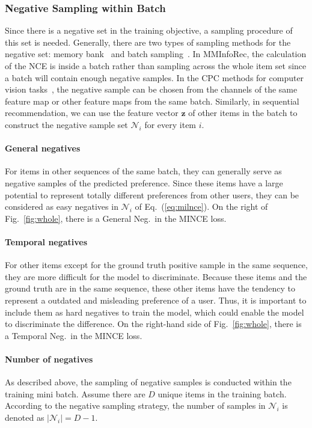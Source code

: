 \documentclass[conference]{IEEEtran}
\begin{document}
\subsubsection{Negative Sampling within Batch}
\label{sec:neg}
Since there is a negative set in the training objective, a sampling procedure of this set is needed. Generally, there are two types of sampling methods for the negative set: memory bank~\cite{moco} and batch sampling~\cite{simclr,cpc,ecpc,memdpc,deepinfomax}. In MMInfoRec, the calculation of the NCE is inside a batch rather than sampling across the whole item set since a batch will contain enough negative samples. In the CPC methods for computer vision tasks~\cite{cpc,ecpc,memdpc,deepinfomax}, the negative sample can be chosen from the channels of the same feature map or other feature maps from the same batch. Similarly, in sequential recommendation, we can use the feature vector $\mathbf{z}$ of other items in the batch to construct the negative sample set $\mathcal{N}_i$ for every item $i$.

\paragraph{General negatives}
For items in other sequences of the same batch, they can generally serve as negative samples of the predicted preference. Since these items have a large potential to represent totally different preferences from other users, they can be considered as easy negatives in $\mathcal{N}_i$ of Eq.~(\ref{eq:milnce}). On the right of Fig.~\ref{fig:whole}, there is a General Neg.\ in the MINCE loss.

\paragraph{Temporal negatives}
For other items except for the ground truth positive sample in the same sequence, they are more difficult for the model to discriminate. Because these items and the ground truth are in the same sequence, these other items have the tendency to represent a outdated and misleading preference of a user. Thus, it is important to include them as hard negatives to train the model, which could enable the model to discriminate the difference. On the right-hand side of Fig.~\ref{fig:whole}, there is a Temporal Neg.\ in the MINCE loss.

\paragraph{Number of negatives}
As described above, the sampling of negative samples is conducted within the training mini batch. Assume there are $D$ unique items in the training batch. According to the negative sampling strategy, the number of samples in $\mathcal{N}_i$ is denoted as $|\mathcal{N}_i|=D-1$.
\end{document}
